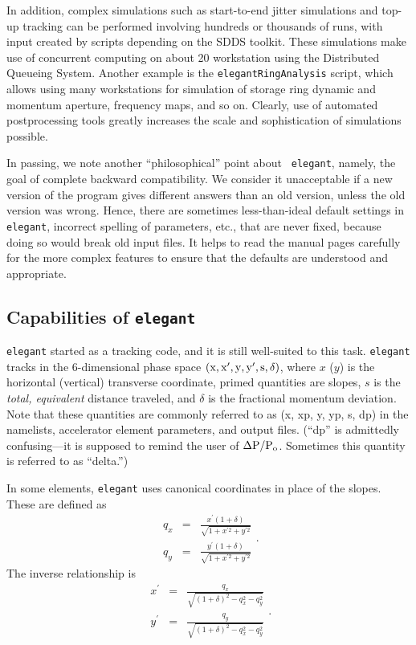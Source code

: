 \documentclass[11pt]{article}
\begin{document}
In addition, complex simulations such as start-to-end jitter
simulations\cite{S2EJitter} and top-up tracking\cite{TopUpTracking}
can be performed involving hundreds or thousands of runs, with input
created by scripts depending on the SDDS toolkit.  These simulations
make use of concurrent computing on about 20 workstation using the
Distributed Queueing System\cite{DQS}.  Another example is the {\tt elegantRingAnalysis} 
script, which allows using many workstations for simulation of storage ring
dynamic and momentum aperture, frequency maps, and so on.
Clearly, use of automated
postprocessing tools greatly increases the scale and sophistication of
simulations possible.  

In passing, we note another ``philosophical'' point about {\tt
elegant}, namely, the goal of complete backward compatibility.  We
consider it unacceptable if a new version of the program gives
different answers than an old version, unless the old version was
wrong.  Hence, there are sometimes less-than-ideal default settings in
{\tt elegant}, incorrect spelling of parameters, etc., that are never
fixed, because doing so would break old input files.  It helps to read
the manual pages carefully for the more complex features to ensure that
the defaults are understood and appropriate.

\subsection{Capabilities of {\tt elegant}}

{\tt elegant} started as a tracking code, and it is still well-suited
to this task.  {\tt elegant} tracks in the 6-dimensional phase space
${\rm (x, x^\prime, y, y^\prime, s, \delta)}$, where $x$ ($y$) is the
horizontal (vertical) transverse coordinate, primed quantities are
slopes, $s$ is the {\em total, equivalent} distance traveled, and $\delta$ is the
fractional momentum deviation\cite{KLBrown}.  Note that these
quantities are commonly referred to as (x, xp, y, yp, s, dp) in the
namelists, accelerator element parameters, and output files.  (``dp''
is admittedly confusing---it is supposed to remind the user of ${\rm
\Delta P/P_o}$.  Sometimes this quantity is referred to as ``delta.'')

In some elements, {\tt elegant} uses canonical coordinates in place of the
slopes. These are defined as
\begin{equation}
\begin{array}{lcl}
q_x & = & \frac{x^\prime (1 + \delta)}{\sqrt{1 + x^{\prime 2} + y^{\prime 2}}} \\
q_y & = & \frac{y^\prime (1 + \delta)}{\sqrt{1 + x^{\prime 2} + y^{\prime 2}}} 
\end{array}.
\end{equation}
The inverse relationship is
\begin{equation}
\begin{array}{lcl}
x^\prime & = & \frac{q_x}{\sqrt{(1+\delta)^2 - q_x^2 - q_y^2}} \\
y^\prime & = & \frac{q_y}{\sqrt{(1+\delta)^2 - q_x^2 - q_y^2}}
\end{array}.
\end{equation}
\end{document}
